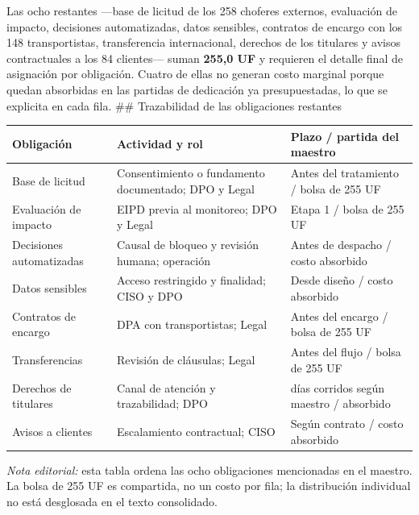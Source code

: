 Las ocho restantes ---base de licitud de los 258 choferes externos, evaluación de impacto, decisiones automatizadas, datos sensibles, contratos de encargo con los 148 transportistas, transferencia internacional, derechos de los titulares y avisos contractuales a los 84 clientes--- suman \textbf{255,0 UF} y requieren el detalle final de asignación por obligación. Cuatro de ellas no generan costo marginal porque quedan absorbidas en las partidas de dedicación ya presupuestadas, lo que se explicita en cada fila. \#\# Trazabilidad de las obligaciones restantes

{\def\LTcaptype{none} %
\begin{longtable}[]{@{}
  >{\raggedright\arraybackslash}p{}
  >{\raggedright\arraybackslash}p{}
  >{\raggedright\arraybackslash}p{}@{}}
\toprule\noalign{}
\begin{minipage}[b]{\linewidth}\raggedright
Obligación
\end{minipage} & \begin{minipage}[b]{\linewidth}\raggedright
Actividad y rol
\end{minipage} & \begin{minipage}[b]{\linewidth}\raggedright
Plazo / partida del maestro
\end{minipage} \\
\midrule\noalign{}
\endhead
\bottomrule\noalign{}
\endlastfoot
Base de licitud & Consentimiento o fundamento documentado; DPO y Legal & Antes del tratamiento / bolsa de 255 UF \\
Evaluación de impacto & EIPD previa al monitoreo; DPO y Legal & Etapa 1 / bolsa de 255 UF \\
Decisiones automatizadas & Causal de bloqueo y revisión humana; operación & Antes de despacho / costo absorbido \\
Datos sensibles & Acceso restringido y finalidad; CISO y DPO & Desde diseño / costo absorbido \\
Contratos de encargo & DPA con transportistas; Legal & Antes del encargo / bolsa de 255 UF \\
Transferencias & Revisión de cláusulas; Legal & Antes del flujo / bolsa de 255 UF \\
Derechos de titulares & Canal de atención y trazabilidad; DPO & 30 días corridos según maestro / absorbido \\
Avisos a clientes & Escalamiento contractual; CISO & Según contrato / costo absorbido \\
\end{longtable}
}

\emph{Nota editorial:} esta tabla ordena las ocho obligaciones mencionadas en el maestro. La bolsa de 255 UF es compartida, no un costo por fila; la distribución individual no está desglosada en el texto consolidado.
